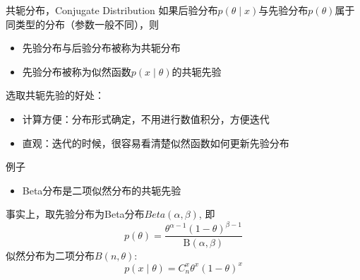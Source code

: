 
\begin{frame}

\begin{block}{共轭分布，Conjugate Distribution}
如果后验分布$p(\theta \mid x)$与先验分布$p(\theta)$属于同类型的分布（参数一般不同），则
\begin{itemize}
\item 先验分布与后验分布被称为共轭分布
\item 先验分布被称为似然函数$p(x \mid \theta)$的共轭先验
\end{itemize}
\end{block}

\vspace{1em}
\pause

选取共轭先验的好处：
\begin{itemize}
\item 计算方便：分布形式确定，不用进行数值积分，方便迭代
\item 直观：迭代的时候，很容易看清楚似然函数如何更新先验分布
\end{itemize}

\end{frame}


\begin{frame}

\begin{block}{例子}
\begin{itemize}
\item Beta分布是二项似然分布的共轭先验
\end{itemize}

\vspace{1em}
\pause

事实上，取先验分布为Beta分布$Beta(\alpha,\beta)$, 即
\[p(\theta) = \dfrac{\theta^{\alpha-1} (1-\theta)^{\beta-1}}{\mathrm{B}(\alpha,\beta)}\]
似然分布为二项分布$B(n,\theta)$:
\[p(x \mid \theta) = C_n^x \theta^x (1-\theta)^x\]
\end{block}

\end{frame}


